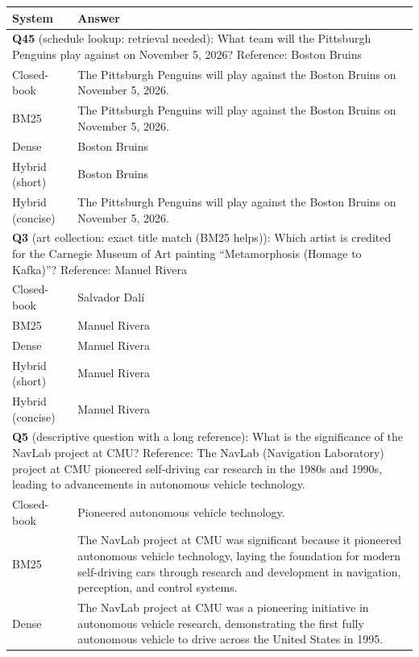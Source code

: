 \begin{table}[t]
\centering
\small
\begin{tabular}{lp{}}
\toprule
System & Answer \\
\midrule
\multicolumn{2}{p{0.95\textwidth}}{\textbf{Q45} (schedule lookup: retrieval needed): What team will the Pittsburgh Penguins play against on November 5, 2026? Reference: Boston Bruins} \\
Closed-book & The Pittsburgh Penguins will play against the Boston Bruins on November 5, 2026. \\
BM25 & The Pittsburgh Penguins will play against the Boston Bruins on November 5, 2026. \\
Dense & Boston Bruins \\
Hybrid (short) & Boston Bruins \\
Hybrid (concise) & The Pittsburgh Penguins will play against the Boston Bruins on November 5, 2026. \\
\midrule
\multicolumn{2}{p{0.95\textwidth}}{\textbf{Q3} (art collection: exact title match (BM25 helps)): Which artist is credited for the Carnegie Museum of Art painting “Metamorphosis (Homage to Kafka)”? Reference: Manuel Rivera} \\
Closed-book & Salvador Dalí \\
BM25 & Manuel Rivera \\
Dense & Manuel Rivera \\
Hybrid (short) & Manuel Rivera \\
Hybrid (concise) & Manuel Rivera \\
\midrule
\multicolumn{2}{p{0.95\textwidth}}{\textbf{Q5} (descriptive question with a long reference): What is the significance of the NavLab project at CMU? Reference: The NavLab (Navigation Laboratory) project at CMU pioneered self-driving car research in the 1980s and 1990s, leading to advancements in autonomous vehicle technology.} \\
Closed-book & Pioneered autonomous vehicle technology. \\
BM25 & The NavLab project at CMU was significant because it pioneered autonomous vehicle technology, laying the foundation for modern self-driving cars through research and development in navigation, perception, and control systems. \\
Dense & The NavLab project at CMU was a pioneering initiative in autonomous vehicle research, demonstrating the first fully autonomous vehicle to drive across the United States in 1995. \\

\end{tabular}
\end{table}
